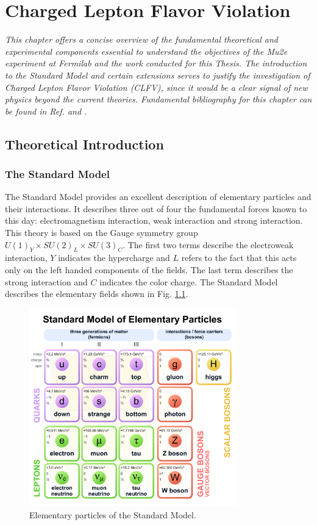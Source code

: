 \chapter{Charged Lepton Flavor Violation}
\textit{This chapter offers a concise overview of the fundamental theoretical and experimental components essential to understand the objectives of the Mu2e experiment at Fermilab and the work conducted for this Thesis. The introduction to the Standard Model and certain extensions serves to justify the investigation of Charged Lepton Flavor Violation (CLFV), since it would be a clear signal of new physics beyond the current theories. Fundamental bibliography for this chapter can be found in Ref. \cite{Bernstein_2013} and \cite{clfv_signorelli}.}
\section{Theoretical Introduction}
\subsection{The Standard Model}
The Standard Model provides an excellent description of elementary particles and their interactions. It describes three out of four the fundamental forces known to this day: electromagnetism interaction, weak interaction and strong interaction. This theory is based on the Gauge symmetry group $U(1)_Y \times SU(2)_L \times SU(3)_C$. The first two terms describe the electroweak interaction, $Y$ indicates the hypercharge and $L$ refers to the fact that this acts only on the left handed components of the fields. The last term describes the strong interaction and $C$ indicates the color charge.
The Standard Model describes the elementary fields shown in Fig. \ref{fig:sm}.

\begin{figure}[!h]
\centering
\includegraphics[width =0.8\textwidth]{figures/pdf/Standard_Model_of_Elementary_Particles.pdf}
\caption{Elementary particles of the Standard Model.}
\label{fig:sm}
\end{figure}


